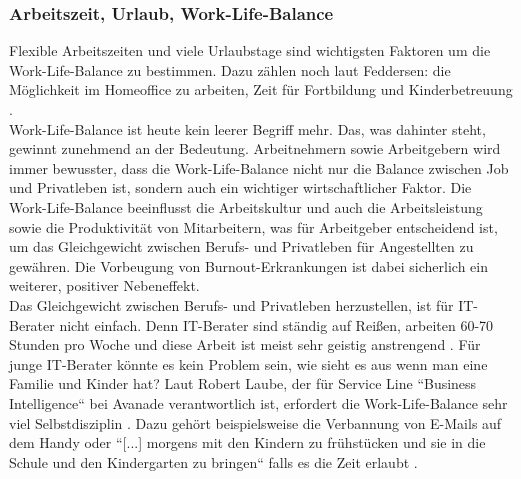 \subsubsection{Arbeitszeit, Urlaub, Work-Life-Balance}
Flexible Arbeitszeiten und viele Urlaubstage sind wichtigsten Faktoren um die Work-Life-Balance zu bestimmen. Dazu zählen noch laut Feddersen: die Möglichkeit im Homeoffice zu arbeiten, Zeit für Fortbildung und Kinderbetreuung \cite{WLB}.\\
Work-Life-Balance ist heute kein leerer Begriff mehr. Das, was dahinter steht, gewinnt zunehmend an der Bedeutung. Arbeitnehmern sowie Arbeitgebern wird immer bewusster, dass die Work-Life-Balance nicht nur die Balance zwischen Job und Privatleben ist, sondern auch ein wichtiger wirtschaftlicher Faktor. Die Work-Life-Balance beeinflusst die Arbeitskultur und auch die Arbeitsleistung sowie die Produktivität von Mitarbeitern, was für Arbeitgeber entscheidend ist, um das Gleichgewicht zwischen Berufs- und Privatleben für Angestellten zu gewähren. Die Vorbeugung von Burnout-Erkrankungen ist dabei sicherlich ein weiterer, positiver Nebeneffekt. \cite{WLB} \\
Das Gleichgewicht zwischen Berufs- und Privatleben herzustellen, ist für IT-Berater nicht einfach. Denn IT-Berater sind ständig auf Reißen, arbeiten 60-70 Stunden pro Woche und diese Arbeit ist meist sehr geistig anstrengend \cite{WLBbeiIT-Berater}. Für junge IT-Berater könnte es kein Problem sein, wie sieht es aus wenn man eine Familie und Kinder hat? Laut Robert Laube, der für Service Line ``Business Intelligence`` bei Avanade verantwortlich ist, erfordert die Work-Life-Balance sehr viel Selbstdisziplin \cite{WLBbeiIT-Berater}. Dazu gehört beispielsweise die Verbannung von E-Mails auf dem Handy oder ``[...] morgens mit den Kindern zu frühstücken und sie in die Schule und den Kindergarten zu bringen`` falls es die Zeit erlaubt \cite{WLBbeiIT-Berater}.

